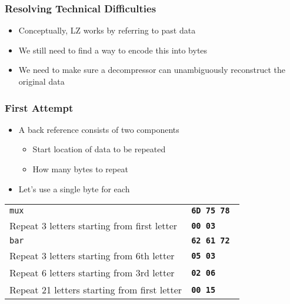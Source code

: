 \documentclass{../ucll-slides}
\newcommand{\hex}[1]{\texttt{\bfseries #1}}
\begin{document}
\begin{frame}
  \frametitle{Resolving Technical Difficulties}
  \begin{itemize}
    \item Conceptually, LZ works by referring to past data
    \item We still need to find a way to encode this into bytes
    \item We need to make sure a decompressor can unambiguously reconstruct the original data
  \end{itemize}
\end{frame}

\begin{frame}
  \frametitle{First Attempt}
  \begin{itemize}
    \item A back reference consists of two components
          \begin{itemize}
            \item Start location of data to be repeated
            \item How many bytes to repeat
          \end{itemize}
    \item Let's use a single byte for each
  \end{itemize}

  \begin{center}
    \begin{tabular}{l@{$\;\rightarrow\;$}l}
      {\tt mux} & \tt \hex{6D} \hex{75} \hex{78} \\
      Repeat 3 letters starting from first letter & \tt \hex{00} \hex{03} \\
      {\tt bar} & \tt \hex{62} \hex{61} \hex{72} \\
      Repeat 3 letters starting from 6th letter & \tt \hex{05} \hex{03} \\
      Repeat 6 letters starting from 3rd letter & \tt \hex{02} \hex{06} \\
      Repeat 21 letters starting from first letter & \tt \hex{00} \hex{15} \\
    \end{tabular}
  \end{center}
\end{frame}
\end{document}

